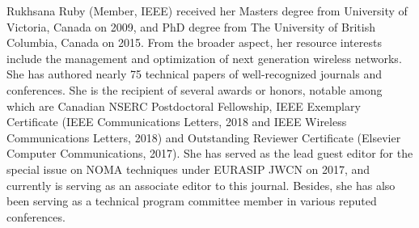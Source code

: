 \documentclass[journal]{IEEEtran}
\begin{document}
\begin{IEEEbiography}
{Rukhsana Ruby} (Member, IEEE) received her Masters degree from University of Victoria, Canada on 2009, and PhD degree from The University of British
Columbia, Canada on 2015. From the broader aspect, her resource interests include the management and optimization of next generation wireless networks. She has authored nearly 75 technical papers of well-recognized journals and conferences. She is the recipient of several awards or honors, notable among which are Canadian NSERC Postdoctoral Fellowship, IEEE Exemplary Certificate (IEEE Communications Letters, 2018 and IEEE Wireless Communications Letters,
2018) and Outstanding Reviewer Certificate (Elsevier Computer Communications, 2017). She has served as the lead guest editor for the special issue on
NOMA techniques under EURASIP JWCN on 2017, and currently is serving as an associate editor to this journal. Besides, she has also been serving as a
technical program committee member in various reputed conferences.
\end{IEEEbiography}
\end{document}
